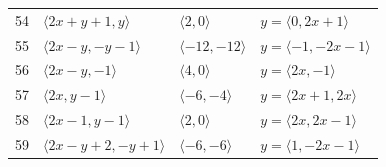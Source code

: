 \documentclass[11pt]{article}
\begin{document}
\begin{longtable}{@{}rlll@{}}
54 & $\langle 2x+y+1,y\rangle$ & $\langle 2,0\rangle$ & $y=\langle 0,2x+1\rangle$\\
55 & $\langle 2x-y,-y-1\rangle$ & $\langle -12,-12\rangle$ & $y=\langle -1,-2x-1\rangle$\\
56 & $\langle 2x-y,-1\rangle$ & $\langle 4,0\rangle$ & $y=\langle 2x,-1\rangle$\\
57 & $\langle 2x,y-1\rangle$ & $\langle -6,-4\rangle$ & $y=\langle 2x+1,2x\rangle$\\
58 & $\langle 2x-1,y-1\rangle$ & $\langle 2,0\rangle$ & $y=\langle 2x,2x-1\rangle$\\
59 & $\langle 2x-y+2,-y+1\rangle$ & $\langle -6,-6\rangle$ & $y=\langle 1,-2x-1\rangle$\\
\end{longtable}
\endgroup

\begingroup\scriptsize
\setlength{\LTcapwidth}{\textwidth}
\end{document}
